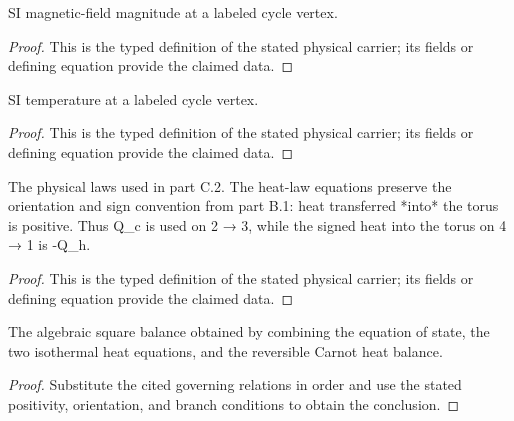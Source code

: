 \begin{definition}
  \label{def:physics:IPhO_2026_3_C_2:aux025}
  SI magnetic-field magnitude at a labeled cycle vertex.
\end{definition}
\begin{proof}
  This is the typed definition of the stated physical carrier; its fields or defining equation provide the claimed data.
\end{proof}

\begin{definition}
  \label{def:physics:IPhO_2026_3_C_2:aux026}
  SI temperature at a labeled cycle vertex.
\end{definition}
\begin{proof}
  This is the typed definition of the stated physical carrier; its fields or defining equation provide the claimed data.
\end{proof}

\begin{definition}
  \label{def:physics:IPhO_2026_3_C_2:aux027}
  The physical laws used in part C.2. The heat-law equations preserve the orientation and sign convention from part B.1: heat transferred *into* the torus is positive. Thus Q\_c is used on 2 → 3, while the signed heat into the torus on 4 → 1 is -Q\_h.
\end{definition}
\begin{proof}
  This is the typed definition of the stated physical carrier; its fields or defining equation provide the claimed data.
\end{proof}

\begin{lemma}
  \label{lem:physics:IPhO_2026_3_C_2:aux028}
  The algebraic square balance obtained by combining the equation of state, the two isothermal heat equations, and the reversible Carnot heat balance.
\end{lemma}
\begin{proof}
  Substitute the cited governing relations in order and use the stated positivity, orientation, and branch conditions to obtain the conclusion.
\end{proof}
